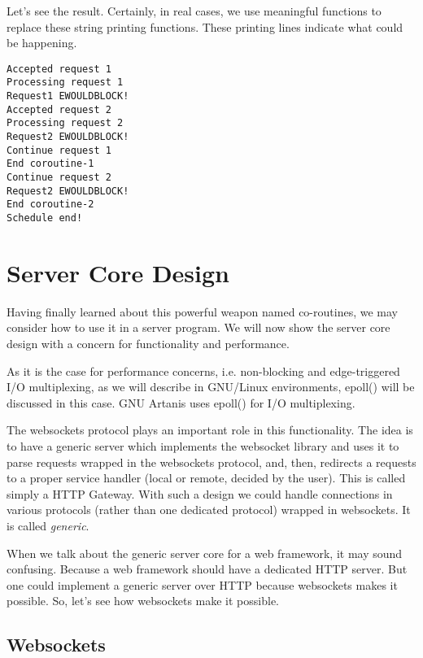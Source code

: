 \documentclass[numbers,numberedpars]{sigplanconf}
\begin{document}


Let's see the result. Certainly, in real cases, we use meaningful functions to replace these string printing functions. These printing lines indicate what could be happening.

\begin{lstlisting}[caption=Coroutines running result]
Accepted request 1
Processing request 1
Request1 EWOULDBLOCK!
Accepted request 2
Processing request 2
Request2 EWOULDBLOCK!
Continue request 1
End coroutine-1
Continue request 2
Request2 EWOULDBLOCK!
End coroutine-2
Schedule end!
\end{lstlisting}

\section{Server Core Design}

Having finally learned about this powerful weapon named co-routines, we may consider how to use it in a server program. We will now show the server core design with a concern for functionality and performance.

As it is the case for performance concerns, i.e. non-blocking and edge-triggered I/O multiplexing, as we will describe in GNU/Linux environments, epoll() will be discussed in this case. GNU Artanis uses epoll() for I/O multiplexing.

The websockets protocol plays an important role in this functionality. The idea is to have a generic server which implements the websocket library and uses it to parse requests wrapped in the websockets protocol, and, then, redirects a requests to a proper service handler (local or remote, decided by the user). This is called simply a HTTP Gateway. With such a design we could handle connections in various protocols (rather than one dedicated protocol) wrapped in websockets. It is called {\it generic}.

When we talk about the generic server core for a web framework, it may sound confusing. Because a web framework should have a dedicated HTTP server. But one could implement a generic server over HTTP because websockets makes it possible. So, let's see how websockets make it possible.

\subsection{Websockets} \label{Websockets}
\end{document}
